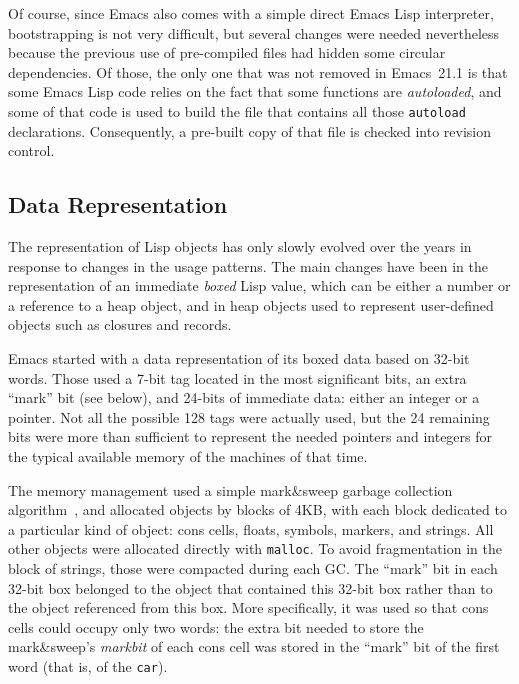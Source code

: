 \documentclass[format=acmsmall,screen]{acmart}
\newcommand \Elisp {Emacs Lisp}
\begin{document}
Of course, since Emacs also comes with a simple direct \Elisp{} interpreter,
bootstrapping is not very difficult, but several changes were needed
nevertheless because the previous use of pre-compiled files had hidden some
circular dependencies.  Of those, the only one that was not removed in
Emacs~21.1 is that some \Elisp{} code relies on the fact that some
functions are \emph{autoloaded}, and some of that code is used to build the
file that contains all those \texttt{autoload} declarations.  Consequently,
a pre-built copy of that file is checked into revision control.

\subsection{Data Representation}
\label{sec:data-representation}

The representation of Lisp objects has only slowly evolved over the years in
response to changes in the usage patterns.  The main changes have been in
the representation of an immediate \emph{boxed} Lisp value, which can be
either a number or a reference to a heap object, and in heap objects used to
represent user-defined objects such as closures and records.

Emacs started with a data representation of its boxed data based on 32-bit
words.  Those used a 7-bit tag located in the most significant bits, an extra
``mark'' bit (see below), and 24-bits of immediate data: either an integer or
a pointer.  Not all the possible 128 tags were actually used, but the 24
remaining bits were more than sufficient to represent the needed pointers and
integers for the typical available memory of the machines of that time.

The memory management used a simple mark\&sweep garbage collection
algorithm~\cite{McCarthy1960}, and allocated objects by blocks of 4\;KB,
with each block dedicated to a particular
kind of object: cons cells, floats, symbols, markers, and
strings. All other objects were allocated directly with \texttt{malloc}.
To avoid fragmentation in the block of strings, those were compacted during
each GC.  The ``mark'' bit in each 32-bit box belonged to the object
that contained this 32-bit box rather than to the object referenced from
this box.  More specifically, it was used so that cons cells could
occupy only two words: the extra bit needed to store the mark\&sweep's
\emph{markbit} of each cons cell was stored in the ``mark'' bit of the first
word (that is, of the \texttt{car}).
\end{document}
